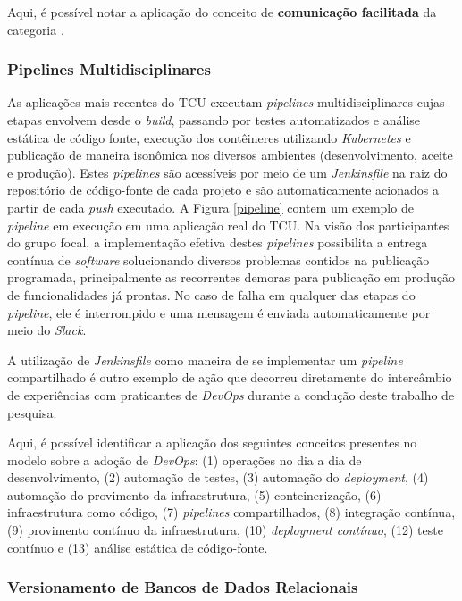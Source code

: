 Aqui, é possível notar a aplicação do conceito de {\bf comunicação facilitada}
da categoria .

\subsubsection{Pipelines Multidisciplinares}

As aplicações mais recentes do \acrshort{TCU} executam {\it pipelines}
multidisciplinares cujas etapas envolvem desde o {\it build}, passando por testes
automatizados e análise estática de código fonte, execução dos contêineres
utilizando {\it Kubernetes} e publicação de maneira isonômica nos diversos
ambientes (desenvolvimento, aceite e produção). Estes {\it pipelines} são
acessíveis por meio de um {\it Jenkinsfile} na raiz do repositório de código-fonte
de cada projeto e são automaticamente acionados a partir de cada {\it push}
executado. A Figura \ref{pipeline} contem um exemplo de {\it pipeline} em execução em uma
aplicação real do \acrshort{TCU}. Na visão dos participantes do grupo focal,
a implementação efetiva destes {\it pipelines} possibilita a entrega contínua
de {\it software} solucionando diversos problemas contidos na publicação
programada, principalmente as recorrentes demoras para publicação em produção
de funcionalidades já prontas. No caso de falha em qualquer das etapas do
{\it pipeline}, ele é interrompido e uma mensagem é enviada automaticamente
por meio do {\it Slack}.


A utilização de {\it Jenkinsfile} como maneira de se implementar um {\it pipeline}
compartilhado é outro exemplo de ação  que decorreu diretamente do intercâmbio
de experiências com praticantes de {\it DevOps} durante a condução deste
trabalho de pesquisa.

Aqui, é possível identificar a aplicação dos seguintes conceitos presentes no
modelo sobre a adoção de {\it DevOps}: (1) operações no dia a dia de
desenvolvimento, (2) automação de testes, (3) automação do {\it deployment},
(4) automação do provimento da infraestrutura, (5) conteinerização,
(6) infraestrutura como código, (7) {\it pipelines} compartilhados, (8) integração
contínua, (9) provimento contínuo da infraestrutura, (10) {\it deployment contínuo},
(12) teste contínuo e (13) análise estática de código-fonte.

\subsubsection{Versionamento de Bancos de Dados Relacionais}

